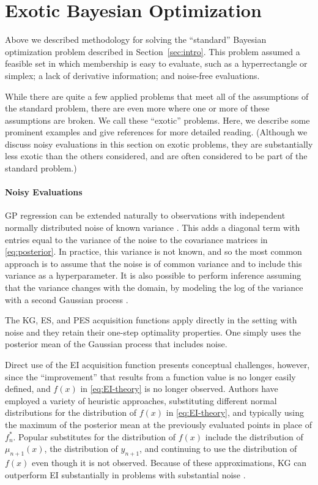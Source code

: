 \documentclass{article}
\begin{document}
\section{Exotic Bayesian Optimization} 
\label{sec:exotic}

Above we described methodology for solving the ``standard'' Bayesian optimization problem described in Section~\ref{sec:intro}.  This problem assumed
a feasible set in which membership is easy to evaluate, such as a hyperrectangle or simplex;
a lack of derivative information;
and noise-free evaluations.

While there are quite a few applied problems that meet all of the assumptions of the standard problem, there are even more where one or more of these assumptions are broken.  We call these  ``exotic'' problems.  Here, we describe some prominent examples and give references for more detailed reading.
(Although we discuss noisy evaluations in this section on exotic problems, they are substantially less exotic than the others considered, and are often considered to be part of the standard problem.) 

\paragraph{Noisy Evaluations}
GP regression can be extended naturally to observations with independent normally distributed noise of known variance \citep{RaWi06}.  This adds a diagonal term with entries equal to the variance of the noise to the covariance matrices in \eqref{eq:posterior}. In practice, this variance is not known, and so the most common approach is to assume that the noise is of common variance and to include this variance as a hyperparameter.  It is also possible to perform inference assuming that the variance changes with the domain, by modeling the log of the variance with a second Gaussian process \citep{kersting2007most}.  

The KG, ES, and PES acquisition functions apply directly in the setting with noise and they retain their one-step optimality properties.  One simply uses the posterior mean of the Gaussian process that includes noise.  

Direct use of the EI acquisition function presents conceptual challenges, however, since the ``improvement'' that results from a function value is no longer easily defined, and $f(x)$ in \eqref{eq:EI-theory} is no longer observed.  Authors have employed a variety of heuristic approaches, substituting different normal distributions for the distribution of $f(x)$ in \eqref{eq:EI-theory}, and typically using the maximum of the posterior mean at the previously evaluated points in place of $f^*_n$.  Popular substitutes for the distribution of $f(x)$ include the distribution of $\mu_{n+1}(x)$, the distribution of $y_{n+1}$, and continuing to use the distribution of $f(x)$ even though it is not observed.  Because of these approximations, KG can outperform EI substantially in problems with substantial noise \citep{wu2016parallel,frazier2009knowledge}.
\end{document}
